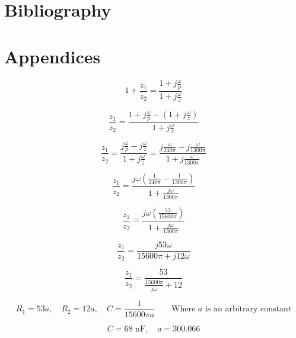 \documentclass[12pt]{article} %
\begin{document}
\section{Bibliography}


\pagebreak





\section{Appendices}

\begin{equation}
	1 + \frac{z_1}{z_2} = \frac{1+j\frac{\omega}{p}}{1+j\frac{\omega}{z}}
\end{equation}

\begin{equation}
	\frac{z_1}{z_2} = \frac{1+j\frac{\omega}{p}-(1+j\frac{\omega}{z})}{1+j\frac{\omega}{z}}
\end{equation}

\begin{equation}
	\frac{z_1}{z_2} = \frac{j\frac{\omega}{p}-j\frac{\omega}{z}}{1+j\frac{\omega}{z}} = \frac{j\frac{\omega}{240\pi}-j\frac{\omega}{1300\pi}}{1+j\frac{\omega}{1300\pi}} 
\end{equation}

\begin{equation}
	\frac{z_1}{z_2} = \frac{j\omega(\frac{1}{240\pi}-\frac{1}{1300\pi})}{1+\frac{j\omega}{1300\pi}}
\end{equation}

\begin{equation}
	\frac{z_1}{z_2} = \frac{j\omega(\frac{53}{15600\pi})}{1+\frac{j\omega}{1300\pi}}
\end{equation}

\begin{equation}
	\frac{z_1}{z_2} = \frac{j53\omega}{15600\pi+j12\omega}
\end{equation}

\begin{equation}
	\frac{z_1}{z_2} = \frac{53}{\frac{15600\pi}{j\omega}+12}
\end{equation}

\begin{equation}
	R_1 = 53a,\quad
	R_2 = 12a,\quad
	C = \frac{1}{15600\pi a}\quad\quad
	\textrm{Where }a\textrm{ is an arbitrary constant}
\end{equation}

\begin{equation}
	C = 68\textrm{ nF},\quad
	a = 300.066
\end{equation}
\end{document}
